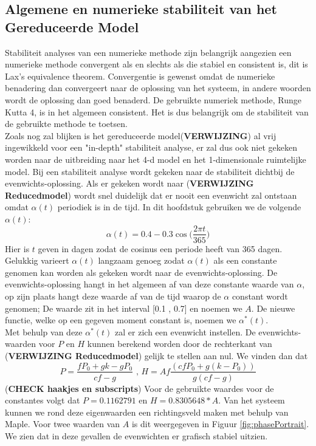 \subsection{Algemene en numerieke stabiliteit van het Gereduceerde Model}
Stabiliteit analyses van een numerieke methode zijn belangrijk aangezien een numerieke methode convergent als en slechts als die stabiel en consistent is, dit is Lax's equivalence theorem. Convergentie is gewenst omdat de numerieke benadering dan convergeert naar de oplossing van het systeem, in andere woorden wordt de oplossing dan goed benaderd. De gebruikte numeriek methode, Runge Kutta 4, is in het algemeen consistent. Het is dus belangrijk om de stabiliteit van de gebruikte methode te toetsen.\\
Zoals nog zal blijken is het gereduceerde model(\textbf{VERWIJZING}) al vrij ingewikkeld voor een "in-depth" stabiliteit analyse, er zal dus ook niet gekeken worden naar de uitbreiding naar het 4-d model en het 1-dimensionale ruimtelijke model. Bij een stabiliteit analyse wordt gekeken naar de stabiliteit dichtbij de evenwichts-oplossing. Als er gekeken wordt naar (\textbf{VERWIJZING Reducedmodel}) wordt snel duidelijk dat er nooit een evenwicht zal ontstaan omdat $\alpha(t)$ periodiek is in de tijd. In dit hoofdstuk gebruiken we de volgende $\alpha(t)$:
\begin{equation}
    \alpha(t)=0.4-0.3 \cos \bigg(\frac{2\pi t}{365}\bigg)
\end{equation}
Hier is $t$ geven in dagen zodat de cosinus een periode heeft van 365 dagen. Gelukkig varieert $\alpha(t)$ langzaam genoeg zodat $\alpha(t)$ als een constante genomen kan worden als gekeken wordt naar de evenwichts-oplossing. De evenwichts-oplossing hangt in het algemeen af van deze constante waarde van $\alpha$, op zijn plaats hangt deze waarde af van de tijd waarop de $\alpha$ constant wordt genomen; De waarde zit in het interval [0.1 , 0.7] en noemen we $A$. De nieuwe functie, welke op een gegeven moment constant is, noemen we $\alpha^*(t)$.\\
Met behulp van deze $\alpha^*(t)$ zal er zich een evenwicht instellen. De evenwichts-waarden voor $P$ en $H$ kunnen berekend worden door de rechterkant van (\textbf{VERWIJZING Reducedmodel}) gelijk te stellen aan nul. We vinden dan dat \begin{equation}
    P=\frac{f P_0+g k-g P_0}{c f-g} \textrm{     ,     } H= Af\frac{(cfP_0+g(k-P_0))}{g(cf-g)}
\end{equation}
(\textbf{CHECK haakjes en subscripts}) 
Voor de gebruikte waardes voor de constantes volgt dat $P = 0.1162791$ en $H = 0.8305648*A$. Van het systeem kunnen we rond deze eigenwaarden een richtingsveld maken met behulp van Maple. Voor twee waarden van $A$ is dit weergegeven in Figuur \ref{fig:phasePortrait}. We zien dat in deze gevallen de evenwichten er grafisch stabiel uitzien.

